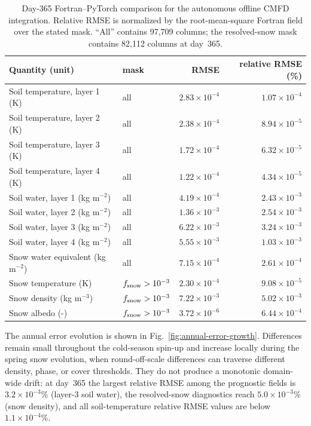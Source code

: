 \begin{table}[t]
\caption{Day-365 Fortran--PyTorch comparison for the autonomous offline
CMFD integration. Relative RMSE is normalized by the root-mean-square
Fortran field over the stated mask. ``All'' contains 97,709 columns; the
resolved-snow mask contains 82,112 columns at day~365.}
\label{tab:annual-autonomous}
\centering
\small
\begin{tabular}{llrr}
\hline
Quantity (unit) & mask & RMSE & relative RMSE (\%) \\
\hline
Soil temperature, layer 1 (K) & all & $2.83\times10^{-4}$ & $1.07\times10^{-4}$ \\
Soil temperature, layer 2 (K) & all & $2.38\times10^{-4}$ & $8.94\times10^{-5}$ \\
Soil temperature, layer 3 (K) & all & $1.72\times10^{-4}$ & $6.32\times10^{-5}$ \\
Soil temperature, layer 4 (K) & all & $1.22\times10^{-4}$ & $4.34\times10^{-5}$ \\
Soil water, layer 1 (kg m$^{-2}$) & all & $4.19\times10^{-4}$ & $2.43\times10^{-3}$ \\
Soil water, layer 2 (kg m$^{-2}$) & all & $1.36\times10^{-3}$ & $2.54\times10^{-3}$ \\
Soil water, layer 3 (kg m$^{-2}$) & all & $6.22\times10^{-3}$ & $3.24\times10^{-3}$ \\
Soil water, layer 4 (kg m$^{-2}$) & all & $5.55\times10^{-3}$ & $1.03\times10^{-3}$ \\
Snow water equivalent (kg m$^{-2}$) & all & $7.15\times10^{-4}$ & $2.61\times10^{-4}$ \\
Snow temperature (K) & $f_{\rm snow}>10^{-3}$ & $2.30\times10^{-4}$ & $9.08\times10^{-5}$ \\
Snow density (kg m$^{-3}$) & $f_{\rm snow}>10^{-3}$ & $7.22\times10^{-3}$ & $5.02\times10^{-3}$ \\
Snow albedo (-) & $f_{\rm snow}>10^{-3}$ & $3.72\times10^{-6}$ & $6.44\times10^{-4}$ \\
\hline
\end{tabular}
\end{table}

The annual error evolution is shown in Fig.~\ref{fig:annual-error-growth}.
Differences remain small throughout the cold-season spin-up and increase
locally during the spring snow evolution, when round-off-scale differences
can traverse different density, phase, or cover thresholds. They do not
produce a monotonic domain-wide drift: at day~365 the largest relative RMSE
among the prognostic fields is $3.2\times10^{-3}$\% (layer-3 soil water),
the resolved-snow diagnostics reach $5.0\times10^{-3}$\% (snow density),
and all soil-temperature relative RMSE values are
below $1.1\times10^{-4}$\%.

